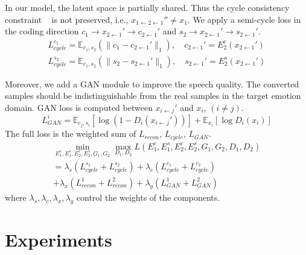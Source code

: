\documentclass{article}
\begin{document}
In our model, the latent space is partially shared. Thus the cycle consistency constraint ~\cite{Zhu_2017_ICCV} is not preserved, i.e., $x_{1\leftarrow2\leftarrow1}'' \neq x_1$. We apply a semi-cycle loss in the coding direction $c_1 \rightarrow x_{2\leftarrow1}' \rightarrow c_{2\leftarrow1}'$ and $s_2 \rightarrow x_{2\leftarrow1}' \rightarrow s_{2\leftarrow1}'$.
\begin{equation}
\begin{aligned}
L_{cycle}^{c_1} = \mathbb{E}_{c_1, s_2} (\| c_1 - c_{2\leftarrow1}' \|_1), \quad c_{2\leftarrow1}'=E_2^c(x_{2\leftarrow1}') \\
L_{cycle}^{s_2} = \mathbb{E}_{c_1, s_2} (\| s_2 - s_{2\leftarrow1}' \|_1), \quad s_{2\leftarrow1}'=E_2^s(x_{2\leftarrow1}')
\end{aligned}
\end{equation}

Moreover, we add a GAN module to improve the speech quality. The converted samples should be indistinguishable from the real samples in the target emotion domain. GAN loss is computed between $x_{i\leftarrow j}'$ and $x_i$, $(i \neq j)$.
\begin{equation}
L_{GAN}^i = \mathbb{E}_{c_j, s_i}[\log(1-D_i(x_{i\leftarrow j}'))] + \mathbb{E}_{x_i}[\log D_i(x_i)]
\end{equation}
The full loss is the weighted sum of $L_{recon}$, $L_{cycle}$, $L_{GAN}$.
\begin{equation}
\begin{aligned}
\min_{E_1^c,E_1^s,E_2^c,E_2^s, G_1,G_2}\max_{D_1,D_2} L(E_1^c, E_1^s, E_2^c, E_2^s, G_1, G_2, D_1, D_2) \\
= \lambda_s (L_{cycle}^{s_1} + L_{cycle}^{s_2}) + \lambda_c (L_{cycle}^{c_1} + L_{cycle}^{c_2}) \ \qquad \qquad \\
+ \lambda_x (L_{recon}^1 + L_{recon}^2) + \lambda_g (L_{GAN}^1 + L_{GAN}^2) \qquad \quad
\end{aligned}
\end{equation}
where $\lambda_s, \lambda_c, \lambda_x, \lambda_g$ control the weights of the components.

\section{Experiments}
\label{sec:exp}
\end{document}
